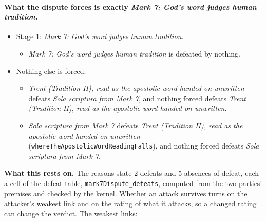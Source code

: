 \documentclass[11pt]{article}
\begin{document}
\paragraph{What the dispute forces is exactly \emph{Mark 7: God’s word judges human tradition}.}
\begin{itemize}
\item Stage 1: \emph{Mark 7: God’s word judges human tradition}.
\begin{itemize}
\item \emph{Mark 7: God’s word judges human tradition} is defeated by nothing.
\end{itemize}
\item Nothing else is forced:
\begin{itemize}
\item \emph{Trent (Tradition II), read as the apostolic word handed on unwritten} defeats \emph{Sola scriptura from Mark 7}, and nothing forced defeats \emph{Trent (Tradition II), read as the apostolic word handed on unwritten}.
\item \emph{Sola scriptura from Mark 7} defeats \emph{Trent (Tradition II), read as the apostolic word handed on unwritten} (\texttt{where\allowbreak{}The\allowbreak{}Apostolic\allowbreak{}Word\allowbreak{}Reading\allowbreak{}Falls}), and nothing forced defeats \emph{Sola scriptura from Mark 7}.
\end{itemize}
\end{itemize}
\par\noindent\textbf{What this rests on.} The reasons state 2 defeats and 5 absences of defeat, each a cell of the defeat table, \texttt{mark7\allowbreak{}Dispute\_\allowbreak{}defeats}, computed from the two parties' premises and checked by the kernel. Whether an attack survives turns on the attacker's weakest link and on the rating of what it attacks, so a changed rating can change the verdict. The weakest links:
\end{document}
